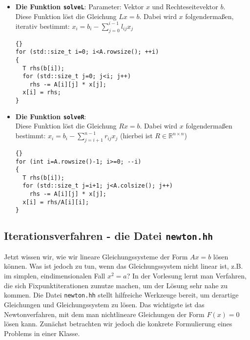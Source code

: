 \documentclass[a4paper,11pt]{article}
\theoremstyle{definition}
\begin{document}
\begin{itemize}
\item \textbf{Die Funktion \lstinline{solveL}}:
Parameter: Vektor $x$ und Rechteseitevektor $b$.\\
Diese Funktion löst die Gleichung $Lx=b$. Dabei wird $x$ folgendermaßen, iterativ bestimmt:
$x_i= b_i - \sum_{j=0}^{i-1} l_{ij}x_j$
{\footnotesize{\begin{lstlisting}{}
for (std::size_t i=0; i<A.rowsize(); ++i)
{
  T rhs(b[i]);
  for (std::size_t j=0; j<i; j++)
    rhs -= A[i][j] * x[j];
  x[i] = rhs;
}
    \end{lstlisting}}}

\item \textbf{Die Funktion \lstinline{solveR}}:\\
Diese Funktion löst die Gleichung $Rx=b$. Dabei wird $x$ folgendermaßen bestimmt:
$x_i= b_i - \sum_{j=i+1}^{n-1}r_{ij}x_j$ (hierbei ist $R \in \mathbb{R}^{n \times n}$)
{\footnotesize{\begin{lstlisting}{}
for (int i=A.rowsize()-1; i>=0; --i)
{
  T rhs(b[i]);
  for (std::size_t j=i+1; j<A.colsize(); j++)
    rhs -= A[i][j] * x[j];
  x[i] = rhs/A[i][i];
}
    \end{lstlisting}}}

\end{itemize}



\subsection{Iterationsverfahren - die Datei \lstinline{newton.hh}}
Jetzt wissen wir, wie wir lineare Gleichungssysteme der Form $Ax = b$ lösen können. Was ist jedoch zu tun, wenn das Gleichungssystem nicht linear ist, z.B. im simplen, eindimensionalen Fall $x^2 = a$? In der Vorlesung lernt man Verfahren, die sich Fixpunktiterationen zunutze machen, um der Lösung sehr nahe zu kommen. Die Datei \lstinline{newton.hh} stellt hilfreiche Werkzeuge bereit, um derartige Gleichungen und Gleichungssystem zu lösen. Das wichtigste ist das Newtonverfahren, mit dem man nichtlineare Gleichungen der Form $F(x) = 0$ lösen kann. Zunächst betrachten wir jedoch die konkrete Formulierung eines Problems in einer Klasse.
\end{document}
